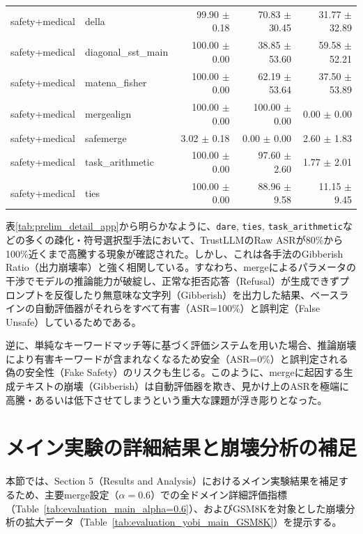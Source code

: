 \documentclass{article}
\begin{document}
\begin{table}[H]
{\begin{tabular}{llrrr}
safety+medical & della & 99.90 $\pm$ 0.18 & 70.83 $\pm$ 30.45 & 31.77 $\pm$ 32.89 \\
safety+medical & diagonal\_sst\_main & 100.00 $\pm$ 0.00 & 38.85 $\pm$ 53.60 & 59.58 $\pm$ 52.21 \\
safety+medical & matena\_fisher & 100.00 $\pm$ 0.00 & 62.19 $\pm$ 53.64 & 37.50 $\pm$ 53.89 \\
safety+medical & mergealign & 100.00 $\pm$ 0.00 & 100.00 $\pm$ 0.00 & 0.00 $\pm$ 0.00 \\
safety+medical & safemerge & 3.02 $\pm$ 0.18 & 0.00 $\pm$ 0.00 & 2.60 $\pm$ 1.83 \\
safety+medical & task\_arithmetic & 100.00 $\pm$ 0.00 & 97.60 $\pm$ 2.60 & 1.77 $\pm$ 2.01 \\
safety+medical & ties & 100.00 $\pm$ 0.00 & 88.96 $\pm$ 9.58 & 11.15 $\pm$ 9.45 \\
\bottomrule
\end{tabular}
}
\end{table}


表\ref{tab:prelim_detail_app}から明らかなように、\texttt{dare}, \texttt{ties}, \texttt{task\_arithmetic}などの多くの疎化・符号選択型手法において、TrustLLMのRaw ASRが80\%から100\%近くまで高騰する現象が確認された。しかし、これは各手法のGibberish Ratio（出力崩壊率）と強く相関している。すなわち、mergeによるパラメータの干渉でモデルの推論能力が破綻し、正常な拒否応答（Refusal）が生成できずプロンプトを反復したり無意味な文字列（Gibberish）を出力した結果、ベースラインの自動評価器がそれらをすべて有害（ASR=100\%）と誤判定（False Unsafe）しているためである。

逆に、単純なキーワードマッチ等に基づく評価システムを用いた場合、推論崩壊により有害キーワードが含まれなくなるため安全（ASR=0\%）と誤判定される偽の安全性（Fake Safety）のリスクも生じる。このように、mergeに起因する生成テキストの崩壊（Gibberish）は自動評価器を欺き、見かけ上のASRを極端に高騰・あるいは低下させてしまうという重大な課題が浮き彫りとなった。

\section{メイン実験の詳細結果と崩壊分析の補足}
本節では、Section 5（Results and Analysis）におけるメイン実験結果を補足するため、主要merge設定（$\alpha=0.6$）での全ドメイン詳細評価指標（Table~\ref{tab:evaluation_main_alpha=0.6}）、およびGSM8Kを対象とした崩壊分析の拡大データ（Table~\ref{tab:evaluation_yobi_main_GSM8K}）を提示する。
\end{document}
